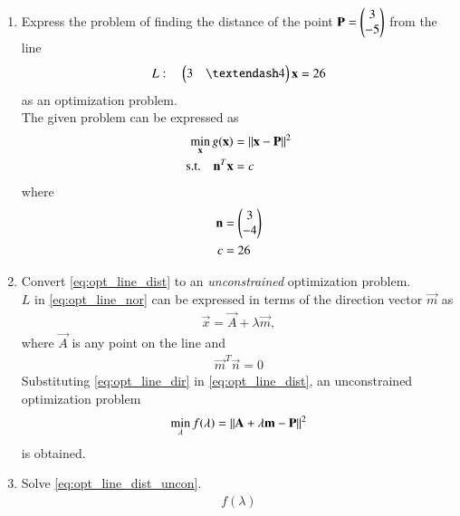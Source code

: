 \renewcommand{\theequation}{\theenumi}
\begin{enumerate}[label=\arabic*.,ref=\thesubsection.\theenumi]
%
%
\item Express the problem of finding the distance of the point $\mathbf{P}=\begin{pmatrix}3\\-5\end{pmatrix}$ from the line 
\label{prob:opt_line_dist}
\begin{align}
\label{eq:opt_line_nor}
L: \quad \myvec{3 & – 4}\vec{x}  = 26
\end{align}
%
as an optimization problem.
\\
\solution The given problem can be expressed as
%
\begin{align}
\label{eq:opt_line_dist}
\min_{\mathbf{x}}g(\mathbf{x}) &= \left\lVert\mathbf{x}-\mathbf{P}\right\rVert^2
\\
\text{s.t.} \quad \mathbf{n}^T\mathbf{x} &= c
\label{eq:opt_line_dist_nor}
\end{align}
%
where 
%
\begin{align}
\mathbf{n} &= \begin{pmatrix}3\\-4\end{pmatrix}
\\
c&=26
\end{align}
%
\item Convert  \eqref{eq:opt_line_dist} to an {\em unconstrained} optimization problem.
%
\\
%
\solution $L$ in \eqref{eq:opt_line_nor} can be expressed in terms of the direction vector $\vec{m}$ as
\begin{align}
\label{eq:opt_line_dir}
\vec{x} = \vec{A} + \lambda \vec{m}, 
\end{align}
where $\vec{A}$ is any point on the line and 
%
\begin{align}
\label{eq:opt_line_orth}
\vec{m}^T\vec{n} = 0
\end{align}
%
Substituting \eqref{eq:opt_line_dir} in \eqref{eq:opt_line_dist}, an unconstrained optimization problem 
\begin{align}
\label{eq:opt_line_dist_uncon}
\min_{\lambda}f(\lambda) = \left\lVert\mathbf{A} + \lambda \mathbf{m}-\mathbf{P}\right\rVert^2 
\end{align}
%
is obtained.
%
\item Solve \eqref{eq:opt_line_dist_uncon}.
%
\\
\solution 
\begin{align}
f(\lambda) 

\end{align}
\end{enumerate}
